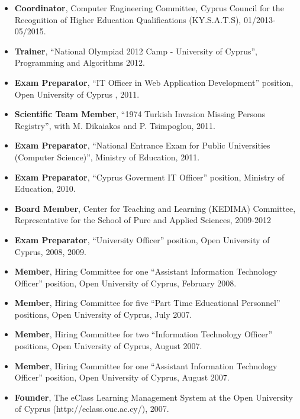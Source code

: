\documentclass[10pt]{article}
\begin{document}
\begin{itemize}
   \item {\bf Coordinator}, Computer Engineering Committee, Cyprus Council for the Recognition of Higher Education Qualifications (KY.S.A.T.S), 01/2013-05/2015.
   \item {\bf Trainer}, ``National Olympiad 2012 Camp - University of Cyprus'', Programming and Algorithms  2012.
   \item {\bf Exam Preparator}, ``IT Officer in Web Application Development'' position, Open University of Cyprus , 2011.
   \item {\bf Scientific Team Member}, ``1974 Turkish Invasion Missing Persons Registry'', with M. Dikaiakos and P. Tsimpoglou, 2011.
   \item {\bf Exam Preparator}, ``National Entrance Exam for Public Universities (Computer Science)'', Ministry of Education, 2011.
   \item {\bf Exam Preparator}, ``Cyprus Goverment IT Officer'' position, Ministry of Education, 2010.
   \item {\bf Board Member}, Center for Teaching and Learning (KEDIMA) Committee, Representative for the School of Pure and Applied Sciences, 2009-2012
   \item {\bf Exam Preparator}, ``University Officer'' position, Open University of Cyprus, 2008, 2009.
   \item {\bf Member}, Hiring Committee for one ``Assistant Information Technology Officer'' position, Open University of Cyprus, February 2008.
   \item {\bf Member}, Hiring Committee for five ``Part Time Educational Personnel'' positions, Open University of Cyprus, July 2007.
   \item {\bf Member}, Hiring Committee for two ``Information Technology Officer'' positions, Open University of Cyprus, August 2007.
   \item {\bf Member}, Hiring Committee for one ``Assistant Information Technology Officer'' position, Open University of Cyprus, August 2007.
   \item {\bf Founder}, The eClass Learning Management System at the Open University of Cyprus (http://eclass.ouc.ac.cy/), 2007.
\end{itemize}

\newpage
\end{document}

